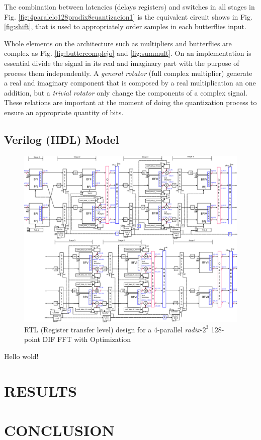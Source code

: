 \documentclass[journal,comsoc]{IEEEtran}
\begin{document}
The combination between latencies (delays registers) and switches in all stages in Fig. \ref{fig:4paralelo128pradix8cuantizacion1} is the equivalent circuit shows in Fig. \ref{fig:shift}, that is used to appropriately order samples in each butterflies input.

Whole elements on the architecture such as multipliers and butterflies are complex as Fig. \ref{fig:buttercomplejo} and \ref{fig:summult}. On an implementation is essential divide the signal in its real and imaginary part with the purpose of process them independently. A \textit{general rotator} (full complex multiplier) generate a real and imaginary component that is composed by a real multiplication an one addition, but a \textit{trivial rotator} only change the components of a complex signal. These relations are important at the moment of doing the quantization process to ensure an appropriate quantity of bits.
\subsection{Verilog (HDL) Model} 
\begin{figure}[t!]
	\centering
	\includegraphics[width=\linewidth]{Diagramas/V5_esquema_p}
	\caption{RTL (Register transfer level) design for a 4-parallel \textit{radix}-$2^3$ 128-point DIF FFT with Optimization}
	\label{fig:v5esquemap}
\end{figure}

Hello wold!



\section{RESULTS}



\section{CONCLUSION}





\end{document}
